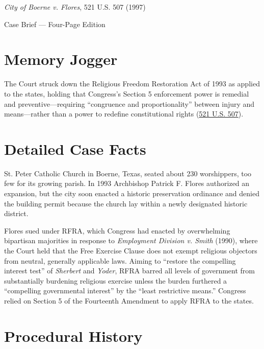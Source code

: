 \documentclass[12pt]{article}
\begin{document}
\begin{center}
{\LARGE \textit{City of Boerne v. Flores}, 521 U.S. 507 (1997)\par}
\vspace{0.8em}
{\large Case Brief --- Four-Page Edition\par}
\end{center}
\vspace{1em}

\section{Memory Jogger}

The Court struck down the Religious Freedom Restoration Act of 1993 as applied to the states, holding that Congress's Section 5 enforcement power is remedial and preventive---requiring ``congruence and proportionality'' between injury and means---rather than a power to redefine constitutional rights (\href{https://supreme.justia.com/cases/federal/us/521/507/}{521 U.S. 507}).

\section{Detailed Case Facts}

St. Peter Catholic Church in Boerne, Texas, seated about 230 worshippers, too few for its growing parish. In 1993 Archbishop Patrick F. Flores authorized an expansion, but the city soon enacted a historic preservation ordinance and denied the building permit because the church lay within a newly designated historic district.

Flores sued under RFRA, which Congress had enacted by overwhelming bipartisan majorities in response to \textit{Employment Division v. Smith} (1990), where the Court held that the Free Exercise Clause does not exempt religious objectors from neutral, generally applicable laws. Aiming to ``restore the compelling interest test'' of \textit{Sherbert} and \textit{Yoder}, RFRA barred all levels of government from substantially burdening religious exercise unless the burden furthered a ``compelling governmental interest'' by the ``least restrictive means.'' Congress relied on Section 5 of the Fourteenth Amendment to apply RFRA to the states.

\section{Procedural History}
\end{document}
